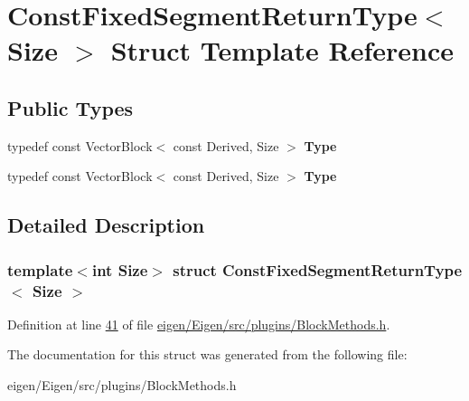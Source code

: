 \hypertarget{struct_const_fixed_segment_return_type}{}\section{Const\+Fixed\+Segment\+Return\+Type$<$ Size $>$ Struct Template Reference}
\label{struct_const_fixed_segment_return_type}
\subsection*{Public Types}
\begin{DoxyCompactItemize}
\item 
\mbox{\label{struct_const_fixed_segment_return_type_af181183dece4cc094f1d4902ade7d121}} 
typedef const Vector\+Block$<$ const Derived, Size $>$ {\bfseries Type}
\item 
\mbox{\label{struct_const_fixed_segment_return_type_af181183dece4cc094f1d4902ade7d121}} 
typedef const Vector\+Block$<$ const Derived, Size $>$ {\bfseries Type}
\end{DoxyCompactItemize}


\subsection{Detailed Description}
\subsubsection*{template$<$int Size$>$\newline
struct Const\+Fixed\+Segment\+Return\+Type$<$ Size $>$}



Definition at line \hyperlink{eigen_2_eigen_2src_2plugins_2_block_methods_8h_source_l00041}{41} of file \hyperlink{eigen_2_eigen_2src_2plugins_2_block_methods_8h_source}{eigen/\+Eigen/src/plugins/\+Block\+Methods.\+h}.



The documentation for this struct was generated from the following file\+:\begin{DoxyCompactItemize}
\item 
eigen/\+Eigen/src/plugins/\+Block\+Methods.\+h\end{DoxyCompactItemize}
